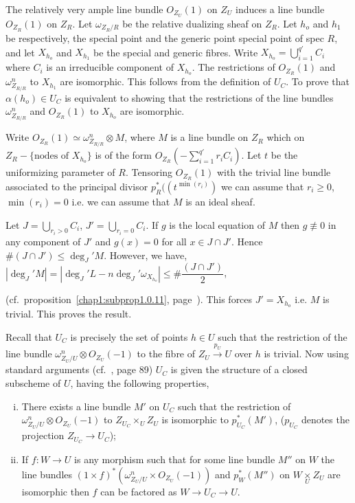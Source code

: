 \noindent
The relatively very ample line bundle $O_{Z_U}(1)$ on $Z_U$ induces a
line bundle $O_{Z_R}(1)$ on $Z_R$. Let $\omega_{Z_R/R}$ be the
relative dualizing sheaf on $Z_R$. Let $h_o$ and $h_1$ be
respectively, the special point and the generic point special point
of spec $R$, and let $X_{h_o}$ and $X_{h_1}$ be the special and
generic fibres. Write $X_{h_o}= \bigcup\limits_{i=1}^{q'} C_i$ where
$C_i$ is an irreducible component of $X_{h_o}$. The restrictions of
$O_{Z_R}(1)$ and  $\omega_{Z_{R / R}}^n$ to $X_{h_1}$ are
isomorphic. This follows from the definition of $U_C$. To prove that
$\alpha (h_o) \in U_C$ is equivalent to showing that the
restrictions of the line bundles $\omega_{Z_{R / R}}^n$ and $O_{Z_R}(1)$ to
$X_{h_o}$ are isomorphic. 

Write $O_{Z_R}(1) \simeq \omega_{Z_{R / R}}^n \otimes M$, where $M$ is a
line bundle on $Z_R$ which on $Z_R - \{\text{nodes of } X_{h_o}\}$ is of
the form $O_{Z_R} (- \sum\limits_{i=1}^{q'} r_i C_i )$. Let $t$ be the
uniformizing parameter of $R$. Tensoring $O_{Z_R}(1)$ with the trivial
line bundle associated to the principal divisor $p^*_R((t^{\min
  (r_i)})$ we can assume that $r_i \geq 0$, $\min (r_i)=0$ i.e. we can
assume that $M$ is an ideal sheaf. 

Let $J= \bigcup\limits_{r_i > 0} C_i$, $J' = \bigcup\limits_{r_i = 0} C_i
$. If $g$ is the local equation of $M$ then $g \not\equiv 0$ in any
component of $J'$ and $g(x) =0$ for all $x \in J \cap
J'$. Hence $\# (J \cap J') \leq \deg _J' M$. However, we have,
$|\deg_J' M| = |\deg _J' L-n \deg_J' \omega_{X_{h_o}} | \leq \#
\dfrac{(J \cap J')}{2}$,\pageoriginale 

(cf.\ proposition~\ref{chap1:subprop1.0.11}, 
page~\pageref{chap1:subprop1.0.11}). This forces $J' = X_{h_o}$ 
i.e. $M$ is trivial. This proves the result. 

Recall that $U_C$ is precisely the set of points $h \in U$
such that the restriction of the line bundle $\omega_{Z_U/U}^n \otimes
O_{Z_U}(-1)$ to the 
fibre of $Z_U \xrightarrow{p_U} U$ over $h$ is trivial. Now using
standard arguments (cf.~\cite{key4}, page 89) $U_C$ is given the structure
of a closed subscheme of $U$, having the following properties, 
\begin{enumerate}[i)]
\item There exists a line bundle $M'$ on $U_C$ such that the
  restriction of $\omega_{Z_U/U}^n \otimes O_{Z_U}(-1)$ to $Z_{U_C}
  \times_U Z_U$ is isomorphic to $p^*_{U_C}(M')$, ($p_{U_C}$ denotes the
  projection $Z_{U_C} \to U_C$); 

\item If $f : W \to U$ is any morphism such that for some line bundle
  $M''$ on $W$ the line bundles $(1 \times f)^* (\omega_{Z_U/U}^n
  \times O_{Z_U} (-1))$ and $p^*_W (M'')$ on  $W \underset{U}\times
  Z_U$ are isomorphic then $f$ can be factored as $W \to U_C \to U$.  
\end{enumerate}

